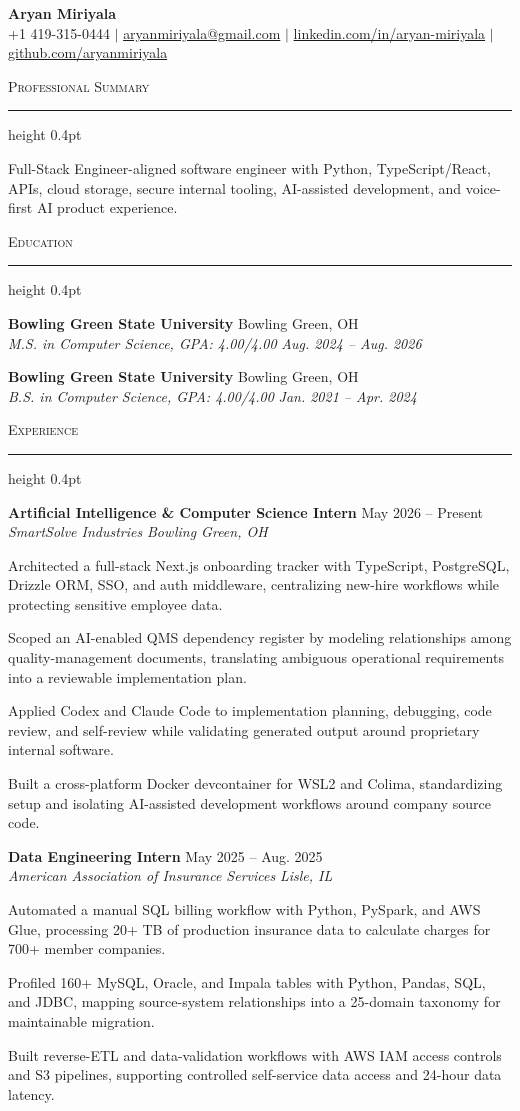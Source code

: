\documentclass[letterpaper,11pt]{article}
\newcommand{\resumesection}[1]{%
  \par\vspace{2pt}%
  {\large\scshape #1}\par\vspace{2pt}%
  \hrule height 0.4pt\vspace{2pt}%
}
\newcommand{\resumeSubheading}[4]{
  \textbf{#1} \hfill #2\\
  \textit{#3} \hfill \textit{#4}
}
\begin{document}
\begin{center}
  {\LARGE \textbf{Aryan Miriyala}}\\[-1pt]
  \small
  +1 419-315-0444 $|$
  \href{mailto:aryanmiriyala@gmail.com}{aryanmiriyala@gmail.com} $|$
  \href{https://www.linkedin.com/in/aryan-miriyala-7788a21b6/}{linkedin.com/in/aryan-miriyala} $|$
  \href{https://github.com/aryanmiriyala}{github.com/aryanmiriyala}
\end{center}\vspace{-10pt}

\resumesection{Professional Summary}
Full-Stack Engineer-aligned software engineer with Python, TypeScript/React, APIs, cloud storage, secure internal tooling, AI-assisted development, and voice-first AI product experience.

\resumesection{Education}
\resumeSubheading
{Bowling Green State University}{Bowling Green, OH}
{M.S. in Computer Science, GPA: 4.00/4.00}{Aug. 2024 -- Aug. 2026}

\resumeSubheading
{Bowling Green State University}{Bowling Green, OH}
{B.S. in Computer Science, GPA: 4.00/4.00}{Jan. 2021 -- Apr. 2024}

\resumesection{Experience}
\resumeSubheading
{Artificial Intelligence \& Computer Science Intern}{May 2026 -- Present}
{SmartSolve Industries}{Bowling Green, OH}
\begin{tightitemize}
  \item Architected a full-stack Next.js onboarding tracker with TypeScript, PostgreSQL, Drizzle ORM, SSO, and auth middleware, centralizing new-hire workflows while protecting sensitive employee data.
  \item Scoped an AI-enabled QMS dependency register by modeling relationships among quality-management documents, translating ambiguous operational requirements into a reviewable implementation plan.
  \item Applied Codex and Claude Code to implementation planning, debugging, code review, and self-review while validating generated output around proprietary internal software.
  \item Built a cross-platform Docker devcontainer for WSL2 and Colima, standardizing setup and isolating AI-assisted development workflows around company source code.
\end{tightitemize}

\resumeSubheading
{Data Engineering Intern}{May 2025 -- Aug. 2025}
{American Association of Insurance Services}{Lisle, IL}
\begin{tightitemize}
  \item Automated a manual SQL billing workflow with Python, PySpark, and AWS Glue, processing 20+ TB of production insurance data to calculate charges for 700+ member companies.
  \item Profiled 160+ MySQL, Oracle, and Impala tables with Python, Pandas, SQL, and JDBC, mapping source-system relationships into a 25-domain taxonomy for maintainable migration.
  \item Built reverse-ETL and data-validation workflows with AWS IAM access controls and S3 pipelines, supporting controlled self-service data access and 24-hour data latency.
\end{tightitemize}
\end{document}

